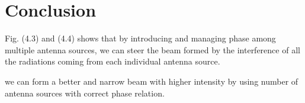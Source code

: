 \section{Conclusion}
Fig. (4.3) and (4.4) shows that by introducing and managing phase among multiple antenna sources, we can steer the beam formed by the interference of all the radiations coming from each individual antenna source.

we can form a better and narrow beam with higher intensity by using number of antenna sources with correct phase relation.
